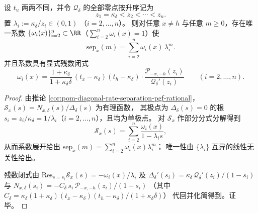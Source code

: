 \begin{theorem}[分离距离的谱展开与残数系数]\label{thm:pom-diagonal-rate-separation-spectral-residue}
设 \(t_u\) 两两不同，并令 \(\mathcal Q_\delta\) 的全部零点按升序记为
\[
z_1=\kappa_\delta<z_2<\cdots<z_n.
\]
置
\(
\lambda_i:=\kappa_\delta/z_i\in(0,1)
\)
（\(i=2,\dots,n\)）。
则对任意 \(x\ne h\) 与任意 \(m\ge 0\)，存在唯一系数 \(\{\omega_i(x)\}_{i=2}^{n}\subset\RR\)（\(\sum_{i=2}^n\omega_i(x)=1\)）使
\[
\mathrm{sep}_x(m)=\sum_{i=2}^{n}\omega_i(x)\,\lambda_i^{m}.
\]
并且系数具有显式残数闭式
\[
\omega_i(x)=\frac{1+\kappa_\delta}{1+\kappa_\delta\delta}\,
(t_x-\kappa_\delta)(t_h-\kappa_\delta)\cdot
\frac{\mathcal P_{-x,-h}(z_i)}{\mathcal Q_\delta'(z_i)}
\qquad(i=2,\dots,n).
\]
\end{theorem}
\begin{proof}
由推论 \ref{cor:pom-diagonal-rate-separation-pgf-rational}，
\(\mathcal S_x(s)=N_{x,\delta}(s)/\Delta_\delta(s)\) 为有理函数，
其极点为 \(\Delta_\delta(s)=0\) 的根 \(s_i=z_i/\kappa_\delta=1/\lambda_i\)（\(i=2,\dots,n\)），且均为单极点。
对 \(\mathcal S_x\) 作部分分式分解得到
\[
\mathcal S_x(s)=\sum_{i=2}^{n}\frac{\omega_i(x)}{1-\lambda_i s},
\]
从而系数展开给出 \(\mathrm{sep}_x(m)=\sum_{i=2}^{n}\omega_i(x)\lambda_i^m\)；
唯一性由 \(\{\lambda_i\}\) 互异的线性无关性给出。
\par
残数闭式由
\(
\mathrm{Res}_{s=s_i}\mathcal S_x(s)=-\omega_i(x)/\lambda_i
\)
及
\(
\Delta_\delta'(s_i)=\kappa_\delta\,\mathcal Q_\delta'(z_i)/(1-s_i)
\)
与 \(N_{x,\delta}(s_i)=-C_\delta\,s_i\,\mathcal P_{-x,-h}(z_i)/(1-s_i)\)
（其中 \(C_\delta=\kappa_\delta(1+\kappa_\delta)(t_x-\kappa_\delta)(t_h-\kappa_\delta)/(1+\kappa_\delta\delta)\)）
代回并化简得到。证毕。
\end{proof}

